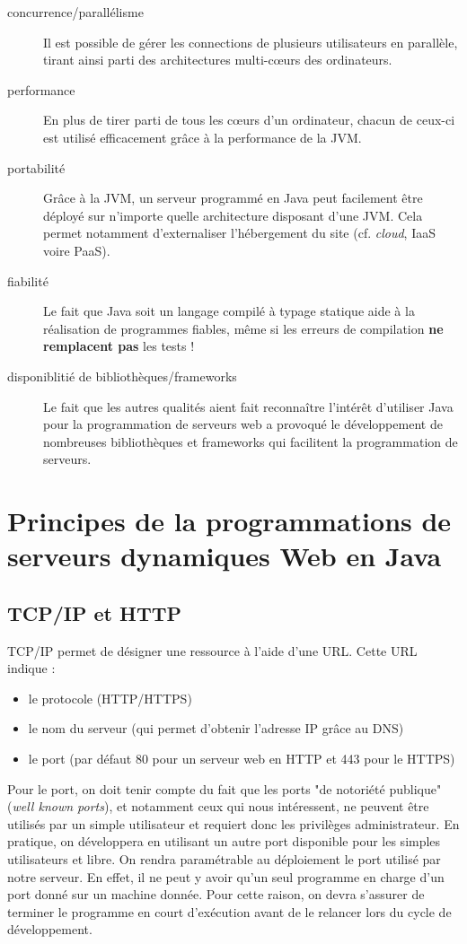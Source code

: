 \documentclass[11pt]{article}
\begin{document}
\begin{description}
\item[{concurrence/parallélisme}] Il est possible de gérer les connections de
plusieurs utilisateurs en parallèle, tirant ainsi parti des architectures
multi-cœurs des ordinateurs.
\item[{performance}] En plus de tirer parti de tous les cœurs d'un ordinateur,
chacun de ceux-ci est utilisé efficacement grâce à la performance de la
JVM.
\item[{portabilité}] Grâce à la JVM, un serveur programmé en Java peut facilement
être déployé sur n'importe quelle architecture disposant d'une JVM. Cela
permet notamment d'externaliser l'hébergement du site (cf. \emph{cloud}, IaaS
voire PaaS).
\item[{fiabilité}] Le fait que Java soit un langage compilé à typage statique aide à
la réalisation de programmes fiables, même si les erreurs de compilation
\textbf{ne remplacent pas} les tests !
\item[{disponiblitié de bibliothèques/frameworks}] Le fait que les autres qualités
aient fait reconnaître l'intérêt d'utiliser Java pour la programmation de
serveurs web a provoqué le développement de nombreuses bibliothèques et
frameworks qui facilitent la programmation de serveurs.
\end{description}

\section{Principes de la programmations de serveurs dynamiques Web en Java}
\label{sec:orgb10e95a}

\subsection{TCP/IP et HTTP}
\label{sec:orgbd024f3}
TCP/IP permet de désigner une ressource à l'aide d'une URL. Cette URL indique :

\begin{itemize}
\item le protocole (HTTP/HTTPS)
\item le nom du serveur (qui permet d'obtenir l'adresse IP grâce au DNS)
\item le port (par défaut 80 pour un serveur web en HTTP et 443 pour le HTTPS)
\end{itemize}

Pour le port, on doit tenir compte du fait que les ports "de notoriété publique"
(\emph{well known ports}), et notamment ceux qui nous intéressent, ne peuvent être
utilisés par un simple utilisateur et requiert donc les privilèges
administrateur. En pratique, on développera en utilisant un autre port
disponible pour les simples utilisateurs et libre. On rendra paramétrable au
déploiement le port utilisé par notre serveur. En effet, il ne peut y avoir
qu'un seul programme en charge d'un port donné sur un machine donnée. Pour cette
raison, on devra s'assurer de terminer le programme en court d'exécution avant
de le relancer lors du cycle de développement.
\end{document}
